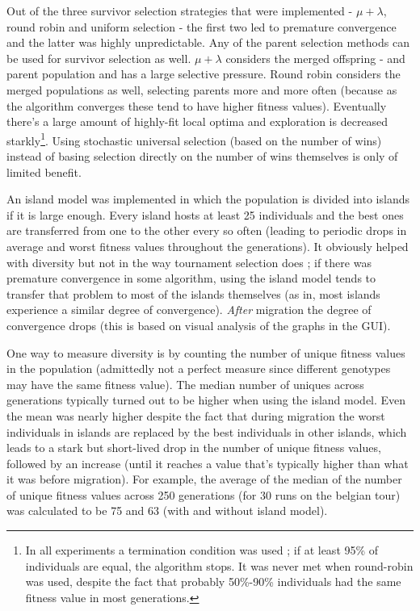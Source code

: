 
Out of the three survivor selection strategies that were implemented - $\mu+\lambda$, round robin and uniform selection - the first two led to premature convergence and the latter was highly unpredictable. Any of the parent selection methods can be used for survivor selection as well. $\mu+\lambda$ considers the merged offspring - and parent population and has a large selective pressure. Round robin considers the merged populations as well, selecting parents more and more often (because as the algorithm converges these tend to have higher fitness values). Eventually there's a large amount of highly-fit local optima and exploration is decreased starkly\footnote{In all experiments a termination condition was used ; if at least 95\% of individuals are equal, the algorithm stops. It was never met when round-robin was used, despite the fact that probably 50\%-90\% individuals had the same fitness value in most generations.}. Using stochastic universal selection (based on the number of wins) instead of basing selection directly on the number of wins themselves is only of limited benefit.  


An island model was implemented in which the population is divided into islands if it is large enough. Every island hosts at least 25 individuals and the best ones are transferred from one to the other every so often (leading to periodic drops in average and worst fitness values throughout the generations). It obviously helped with diversity but not in the way tournament selection does ; if there was premature convergence in some algorithm, using the island model tends to transfer that problem to most of the islands themselves (as in, most islands experience a similar degree of convergence). \textit{After} migration the degree of convergence drops (this is based on visual analysis of the graphs in the GUI). \\

\par\noindent One way to measure diversity is by counting the number of unique fitness values in the population (admittedly not a perfect measure since different genotypes may have the same fitness value). The median number of uniques across generations typically turned out to be higher when using the island model. Even the mean was nearly higher despite the fact that during migration the worst individuals in islands are replaced by the best individuals in other islands, which leads to a stark but short-lived drop in the number of unique fitness values, followed by an increase (until it reaches a value that's typically higher than what it was before migration). For example, the average of the median of the number of unique fitness values across 250 generations (for 30 runs on the belgian tour) was calculated to be 75 and 63 (with and without island model).

